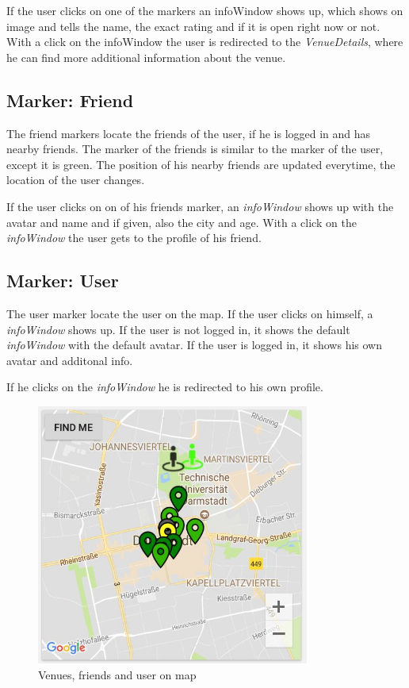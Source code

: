 If the user clicks on one of the markers an infoWindow shows up, which shows on image and tells the name, the exact rating and if it is open right now or not. With a click on the infoWindow the user is redirected to the \textit{VenueDetails}, where he can find more additional information about the venue.

\subsection{Marker: Friend}
The friend markers locate the friends of the user, if he is logged in and has nearby friends. The marker of the friends is similar to the marker of the user, except it is green.
The position of his nearby friends are updated everytime, the location of the user changes. 

If the user clicks on on of his friends marker, an \textit{infoWindow} shows up with the avatar and name and if given, also the city and age. With a click on the \textit{infoWindow} the user gets to the profile of his friend.

\subsection{Marker: User}
The user marker locate the user on the map. If the user clicks on himself, a \textit{infoWindow} shows up. If the user is not logged in, it shows the default \textit{infoWindow} with the default avatar. If the user is logged in, it shows his own avatar and additonal info. 

If he clicks on the \textit{infoWindow} he is redirected to his own profile.

\begin{figure}[htbp]
 	\includegraphics[width=0.8\textwidth]{images/venuesonmap.jpg}
 	\centering
 	\caption[]{Venues, friends and user on map}
 	\label{fig:venuesonmap}
\end{figure}





